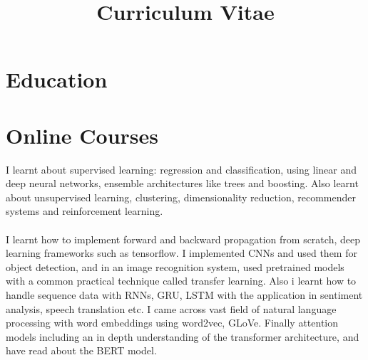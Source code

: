 \documentclass[11pt,a4paper,sans]{moderncv}
\title{Curriculum Vitae}
\begin{document}
\makecvtitle

\section{Education}
\vspace{10pt}
\section{Online Courses}
\vspace{2pt}
I learnt about supervised learning: regression and classification, using linear and deep neural networks, ensemble architectures like trees and boosting. Also learnt about unsupervised learning, clustering, dimensionality reduction, recommender systems and reinforcement learning.\\ \\
\vspace{2pt}
I learnt how to implement forward and backward propagation from scratch, deep learning frameworks such as tensorflow. I implemented CNNs and used them for object detection, and in an image recognition system, used pretrained models with a common practical technique called transfer learning. Also i learnt how to handle sequence data with RNNs, GRU, LSTM with the application in sentiment analysis, speech translation etc. I came across vast field of natural language processing with word embeddings using word2vec, GLoVe. Finally attention models including an in depth understanding of the transformer architecture, and have read about the BERT model.\\ \\
\vspace{2pt}
\end{document}
